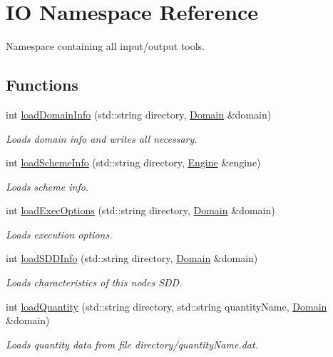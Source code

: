 \hypertarget{namespaceIO}{}\section{IO Namespace Reference}
\label{namespaceIO}


Namespace containing all input/output tools.  


\subsection*{Functions}
\begin{DoxyCompactItemize}
\item 
int \mbox{\hyperlink{namespaceIO_ab1b5447a50be31c6e04b64a13c58a05d}{load\+Domain\+Info}} (std\+::string directory, \mbox{\hyperlink{classDomain}{Domain}} \&domain)
\begin{DoxyCompactList}\small\item\em Loads domain info and writes all necessary. \end{DoxyCompactList}\item 
int \mbox{\hyperlink{namespaceIO_acc60681d98975d0ce0d3580de4f70ecd}{load\+Scheme\+Info}} (std\+::string directory, \mbox{\hyperlink{classEngine}{Engine}} \&engine)
\begin{DoxyCompactList}\small\item\em Loads scheme info. \end{DoxyCompactList}\item 
int \mbox{\hyperlink{namespaceIO_ae9baa8f2d704798ba4b669718c5630c6}{load\+Exec\+Options}} (std\+::string directory, \mbox{\hyperlink{classDomain}{Domain}} \&domain)
\begin{DoxyCompactList}\small\item\em Loads execution options. \end{DoxyCompactList}\item 
int \mbox{\hyperlink{namespaceIO_a2d97d3a808e25f48fa483719b3927273}{load\+S\+D\+D\+Info}} (std\+::string directory, \mbox{\hyperlink{classDomain}{Domain}} \&domain)
\begin{DoxyCompactList}\small\item\em Loads characteristics of this node\textquotesingle{}s S\+DD. \end{DoxyCompactList}\item 
int \mbox{\hyperlink{namespaceIO_a0b5a994855e5e391320a431095d66400}{load\+Quantity}} (std\+::string directory, std\+::string quantity\+Name, \mbox{\hyperlink{classDomain}{Domain}} \&domain)
\begin{DoxyCompactList}\small\item\em Loads quantity data from file directory/quantity\+Name.\+dat. \end{DoxyCompactList}\item 

\end{DoxyCompactItemize}
